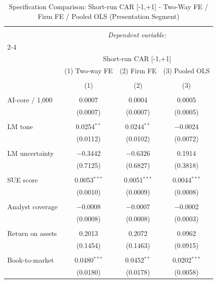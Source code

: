 
\begin{table}[!htbp] \centering 
  \caption{Specification Comparison: Short-run CAR [-1,+1] - Two-Way FE / Firm FE / Pooled OLS (Presentation Segment)} 
  \label{} 
\begin{tabular}{@{\extracolsep{5pt}}lccc} 
\\[-1.8ex]\hline 
\hline \\[-1.8ex] 
 & \multicolumn{3}{c}{\textit{Dependent variable:}} \\ 
\cline{2-4} 
\\[-1.8ex] & \multicolumn{3}{c}{Short-run CAR [-1,+1]} \\ 
 & (1) Two-way FE & (2) Firm FE & (3) Pooled OLS \\ 
\\[-1.8ex] & (1) & (2) & (3)\\ 
\hline \\[-1.8ex] 
 AI-core / 1,000 & 0.0007 & 0.0004 & 0.0005 \\ 
  & (0.0007) & (0.0007) & (0.0005) \\ 
  & & & \\ 
 LM tone & 0.0254$^{**}$ & 0.0244$^{**}$ & $-$0.0024 \\ 
  & (0.0112) & (0.0102) & (0.0072) \\ 
  & & & \\ 
 LM uncertainty & $-$0.3442 & $-$0.6326 & 0.1914 \\ 
  & (0.7125) & (0.6827) & (0.3818) \\ 
  & & & \\ 
 SUE score & 0.0053$^{***}$ & 0.0051$^{***}$ & 0.0044$^{***}$ \\ 
  & (0.0010) & (0.0009) & (0.0008) \\ 
  & & & \\ 
 Analyst coverage & $-$0.0008 & $-$0.0007 & $-$0.0002 \\ 
  & (0.0008) & (0.0008) & (0.0003) \\ 
  & & & \\ 
 Return on assets & 0.2013 & 0.2072 & 0.0962 \\ 
  & (0.1454) & (0.1463) & (0.0915) \\ 
  & & & \\ 
 Book-to-market & 0.0480$^{***}$ & 0.0452$^{**}$ & 0.0202$^{***}$ \\ 
  & (0.0180) & (0.0178) & (0.0058) \\ 

\end{tabular}
\end{table}
